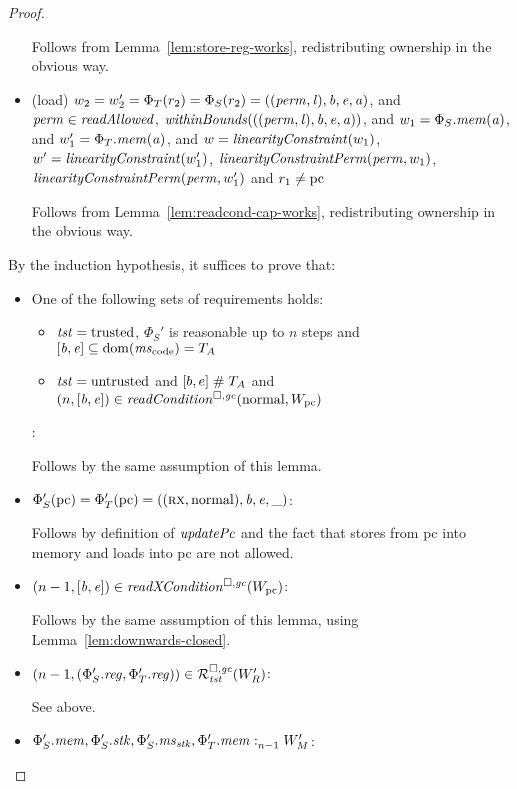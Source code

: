 \begin{proof}
\begin{itemize}
    Follows from Lemma~\ref{lem:store-reg-works}, redistributing ownership in the obvious way.

  \item (load) $w_2 = w_2' = \Phi_T(r_2) = \Phi_S(r_2) =
    ((\perm,\lin),\baddr,\eaddr,\aaddr)$, and $\perm \in \readAllowed{}$,
    $\withinBounds{((\perm,\lin),\baddr,\eaddr,\aaddr)}$, and
    $w_1 = \Phi_S.\mem(\aaddr)$, and $w_1' = \Phi_T.\mem(\aaddr)$, and
    $w = \linCons{w_1}$, $w' = \linCons{w_1'}$, $\linConsPerm{\perm}{w_1}$, $\linConsPerm{\perm}{w_1'}$ and $r_1 \neq \pcreg$

    Follows from Lemma~\ref{lem:readcond-cap-works}, redistributing ownership in the obvious way.

  \end{itemize}

  By the induction hypothesis, it suffices to prove that:
  \begin{itemize}
  \item One of the following sets of requirements holds:
    \begin{itemize}
    \item $\trust = \trusted$, $\Phi_S'$ is reasonable up to $n$ steps and $[\baddr,\eaddr] \subseteq \dom(\mscode) = \ta$
    \item $\trust = \untrusted$ and $[b,e] \mathrel{\#} \ta$ and $\npair{[\baddr,\eaddr]} \in \readCond{\normal,W_\pcreg}$
    \end{itemize}:

    Follows by the same assumption of this lemma.

  \item $\Phi_S'(\pcreg) = \Phi_T'(\pcreg) = ((\rx,\normal),\baddr,\eaddr,\_)$:

    Follows by definition of $\updPcAddr{}$ and the fact that stores from pc into memory and loads into pc are not allowed.

  \item $\npair[n-1]{[\baddr,\eaddr]} \in \xReadCond{W_\pcreg}$:

    Follows by the same assumption of this lemma, using Lemma~\ref{lem:downwards-closed}.

  \item $\npair[n-1]{(\Phi_S'.\reg,\Phi_T'.\reg)} \in \lrrg{\trust}(W_R')$:

    See above.

  \item $\memSat[n-1]{\Phi_S'.\mem,\Phi_S'.\stk,\Phi_S'.\ms_\stk,\Phi_T'.\mem}{W_M'}$:


\end{itemize}
\end{proof}
